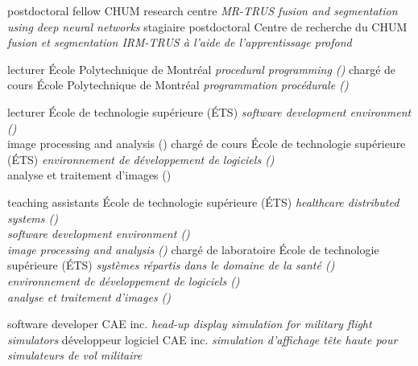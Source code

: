 \documentclass[print]{friggeri-cv}
\begin{document}
\begin{entrylist}
  \engfr
  { {postdoctoral fellow} {CHUM research centre} {\emph{MR-TRUS fusion and segmentation using deep neural networks}}}
  { {stagiaire postdoctoral} {Centre de recherche du CHUM} {\emph{fusion et segmentation IRM-TRUS à l'aide de l'apprentissage profond}}}

  \engfr
  { {lecturer} {École Polytechnique de Montréal} {\emph{procedural programming (\infmat)}}}
  { {chargé de cours} {École Polytechnique de Montréal} {\emph{programmation procédurale (\infmat)}}}

  \engfr
  { {lecturer} {École de technologie supérieure {\scriptsize (ÉTS)}} {\emph{software development environment (\eleenv)}\\image processing and analysis (\eletr) }}
  { {chargé de cours} {École de technologie supérieure {\scriptsize (ÉTS)}} {\emph{environnement de développement de logiciels (\eleenv)}\\analyse et traitement d'images (\eletr)}}

  \engfr
  { {teaching assistants} {École de technologie supérieure {\scriptsize (ÉTS)}} {\emph{healthcare distributed systems (\gtssys)\\software development environment (\eleenv)\\image processing and analysis (\eletr)}}}
  { {chargé de laboratoire} {École de technologie supérieure {\scriptsize (ÉTS)}} {\emph{systèmes répartis dans le domaine de la santé (\gtssys)\\environnement de développement de logiciels (\eleenv)\\analyse et traitement d'images (\eletr)}}}

  \engfr
  { {software developer} {\scriptsize{CAE} inc.} {\emph{head-up display simulation for military flight simulators}}}
  { {développeur logiciel} {\scriptsize{CAE} inc.} {\emph{simulation d'affichage tête haute pour simulateurs de vol militaire}}}

\end{entrylist}
\end{document}
